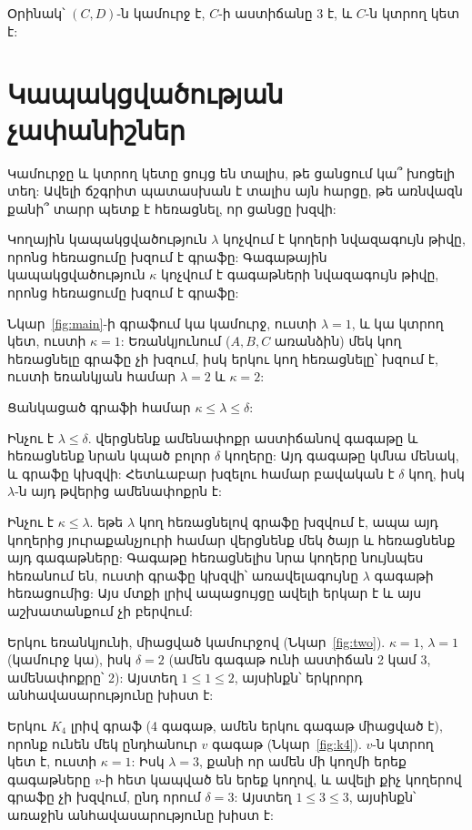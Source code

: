 Օրինակ՝ $(C,D)$-ն կամուրջ է, $C$-ի աստիճանը 3 է, և $C$-ն կտրող կետ է:

\section{Կապակցվածության չափանիշներ}

Կամուրջը և կտրող կետը ցույց են տալիս, թե ցանցում կա՞ խոցելի տեղ: Ավելի ճշգրիտ պատասխան է տալիս այն հարցը, թե առնվազն քանի՞ տարր պետք է հեռացնել, որ ցանցը խզվի:

\begin{definition}
Կողային կապակցվածություն $\lambda$ կոչվում է կողերի նվազագույն թիվը, որոնց հեռացումը խզում է գրաֆը: Գագաթային կապակցվածություն $\kappa$ կոչվում է գագաթների նվազագույն թիվը, որոնց հեռացումը խզում է գրաֆը:
\end{definition}

\begin{example}
Նկար~\ref{fig:main}-ի գրաֆում կա կամուրջ, ուստի $\lambda=1$, և կա կտրող կետ, ուստի $\kappa=1$: Եռանկյունում ($A,B,C$ առանձին) մեկ կող հեռացնելը գրաֆը չի խզում, իսկ երկու կող հեռացնելը՝ խզում է, ուստի եռանկյան համար $\lambda=2$ և $\kappa=2$:
\end{example}

\begin{theorem}[Ուիթնի]
Ցանկացած գրաֆի համար $\kappa\le\lambda\le\delta$:
\end{theorem}

Ինչու է $\lambda\le\delta$. վերցնենք ամենափոքր աստիճանով գագաթը և հեռացնենք նրան կպած բոլոր $\delta$ կողերը: Այդ գագաթը կմնա մենակ, և գրաֆը կխզվի: Հետևաբար խզելու համար բավական է $\delta$ կող, իսկ $\lambda$-ն այդ թվերից ամենափոքրն է:

Ինչու է $\kappa\le\lambda$. եթե $\lambda$ կող հեռացնելով գրաֆը խզվում է, ապա այդ կողերից յուրաքանչյուրի համար վերցնենք մեկ ծայր և հեռացնենք այդ գագաթները: Գագաթը հեռացնելիս նրա կողերը նույնպես հեռանում են, ուստի գրաֆը կխզվի՝ առավելագույնը $\lambda$ գագաթի հեռացումից: Այս մտքի լրիվ ապացույցը ավելի երկար է և այս աշխատանքում չի բերվում:

\begin{example}\label{ex:ineq}
Երկու եռանկյունի, միացված կամուրջով (Նկար~\ref{fig:two}). $\kappa=1$, $\lambda=1$ (կամուրջ կա), իսկ $\delta=2$ (ամեն գագաթ ունի աստիճան 2 կամ 3, ամենափոքրը՝ 2): Այստեղ $1\le1\le2$, այսինքն՝ երկրորդ անհավասարությունը խիստ է:

Երկու $K_4$ լրիվ գրաֆ (4 գագաթ, ամեն երկու գագաթ միացված է), որոնք ունեն մեկ ընդհանուր $v$ գագաթ (Նկար~\ref{fig:k4}). $v$-ն կտրող կետ է, ուստի $\kappa=1$: Իսկ $\lambda=3$, քանի որ ամեն մի կողմի երեք գագաթները $v$-ի հետ կապված են երեք կողով, և ավելի քիչ կողերով գրաֆը չի խզվում, ընդ որում $\delta=3$: Այստեղ $1\le3\le3$, այսինքն՝ առաջին անհավասարությունը խիստ է:
\end{example}

